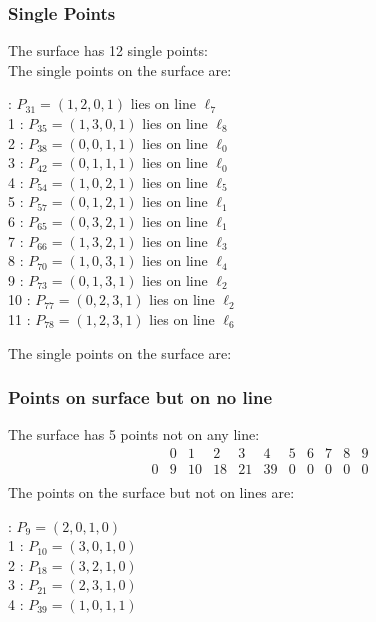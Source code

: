 \documentclass{article}
\begin{document}
{\subsubsection*{Single Points}
The surface has 12 single points:\\
The single points on the surface are:\\
\begin{multicols}{2}
 : $P_{31}=( 1, 2, 0, 1 )$ lies on line $\ell_{7}$\\
1 : $P_{35}=( 1, 3, 0, 1 )$ lies on line $\ell_{8}$\\
2 : $P_{38}=( 0, 0, 1, 1 )$ lies on line $\ell_{0}$\\
3 : $P_{42}=( 0, 1, 1, 1 )$ lies on line $\ell_{0}$\\
4 : $P_{54}=( 1, 0, 2, 1 )$ lies on line $\ell_{5}$\\
5 : $P_{57}=( 0, 1, 2, 1 )$ lies on line $\ell_{1}$\\
6 : $P_{65}=( 0, 3, 2, 1 )$ lies on line $\ell_{1}$\\
7 : $P_{66}=( 1, 3, 2, 1 )$ lies on line $\ell_{3}$\\
8 : $P_{70}=( 1, 0, 3, 1 )$ lies on line $\ell_{4}$\\
9 : $P_{73}=( 0, 1, 3, 1 )$ lies on line $\ell_{2}$\\
10 : $P_{77}=( 0, 2, 3, 1 )$ lies on line $\ell_{2}$\\
11 : $P_{78}=( 1, 2, 3, 1 )$ lies on line $\ell_{6}$\\
\end{multicols}
The single points on the surface are:\\
\subsubsection*{Points on surface but on no line}
The surface has 5 points not on any line:\\
$$
\begin{array}{r|*{10}{r}}
 & 0 & 1 & 2 & 3 & 4 & 5 & 6 & 7 & 8 & 9\\
\hline
0 & 9 & 10 & 18 & 21 & 39 & 0 & 0 & 0 & 0 & 0\\
\end{array}
$$
The points on the surface but not on lines are:\\
\begin{multicols}{2}
 : $P_{9}=( 2, 0, 1, 0 )$\\
1 : $P_{10}=( 3, 0, 1, 0 )$\\
2 : $P_{18}=( 3, 2, 1, 0 )$\\
3 : $P_{21}=( 2, 3, 1, 0 )$\\
4 : $P_{39}=( 1, 0, 1, 1 )$\\
\end{multicols}
}
\end{document}
